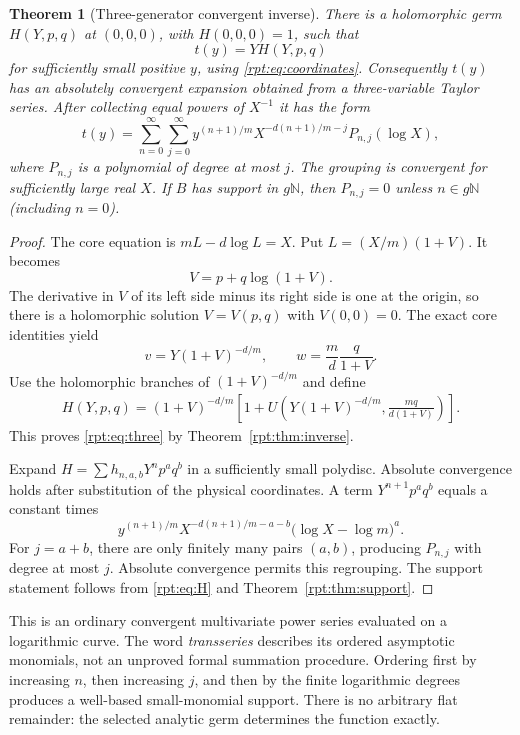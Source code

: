 \documentclass[11pt,a4paper]{article}
\numberwithin{equation}{section}
\newtheorem{theorem}{Theorem}[section]
\theoremstyle{definition}\newtheorem{definition}[theorem]{Definition}
\theoremstyle{remark}\newtheorem{remark}[theorem]{Remark}
\newcommand{\N}{\mathbb N}
\begin{document}
\begin{theorem}[Three-generator convergent inverse]
\label{rpt:thm:three}
There is a holomorphic germ $H(Y,p,q)$ at $(0,0,0)$, with $H(0,0,0)=1$, such that
\begin{equation}
t(y)=YH(Y,p,q)
\label{rpt:eq:three}
\end{equation}
for sufficiently small positive $y$, using \eqref{rpt:eq:coordinates}. Consequently $t(y)$ has an absolutely convergent expansion obtained from a three-variable Taylor series. After collecting equal powers of $X^{-1}$ it has the form
\begin{equation}
t(y)=\sum_{n=0}^{\infty}\sum_{j=0}^{\infty}
y^{(n+1)/m}X^{-d(n+1)/m-j}P_{n,j}(\log X),
\label{rpt:eq:transseries}
\end{equation}
where $P_{n,j}$ is a polynomial of degree at most $j$. The grouping is convergent for sufficiently large real $X$. If $B$ has support in $g\N$, then $P_{n,j}=0$ unless $n\in g\N$ (including $n=0$).
\end{theorem}
\begin{proof}
The core equation is $mL-d\log L=X$. Put $L=(X/m)(1+V)$. It becomes
\begin{equation}
V=p+q\log(1+V).
\label{rpt:eq:V}
\end{equation}
The derivative in $V$ of its left side minus its right side is one at the origin, so there is a holomorphic solution $V=V(p,q)$ with $V(0,0)=0$. The exact core identities yield
\[
v=Y(1+V)^{-d/m},\qquad
w=\frac{m}{d}\frac{q}{1+V}.
\]
Use the holomorphic branches of $(1+V)^{-d/m}$ and define
\begin{align}
H(Y,p,q)=(1+V)^{-d/m}
\left[1+U\left(Y(1+V)^{-d/m},\frac{m q}{d(1+V)}\right)\right].
\label{rpt:eq:H}
\end{align}
This proves \eqref{rpt:eq:three} by Theorem~\ref{rpt:thm:inverse}.

Expand $H=\sum h_{n,a,b}Y^np^aq^b$ in a sufficiently small polydisc. Absolute convergence holds after substitution of the physical coordinates. A term $Y^{n+1}p^aq^b$ equals a constant times
\[
y^{(n+1)/m}X^{-d(n+1)/m-a-b}\bigl(\log X-\log m\bigr)^a.
\]
For $j=a+b$, there are only finitely many pairs $(a,b)$, producing $P_{n,j}$ with degree at most $j$. Absolute convergence permits this regrouping. The support statement follows from \eqref{rpt:eq:H} and Theorem~\ref{rpt:thm:support}.
\end{proof}

This is an ordinary convergent multivariate power series evaluated on a logarithmic curve. The word \emph{transseries} describes its ordered asymptotic monomials, not an unproved formal summation procedure. Ordering first by increasing $n$, then increasing $j$, and then by the finite logarithmic degrees produces a well-based small-monomial support. There is no arbitrary flat remainder: the selected analytic germ determines the function exactly.
\end{document}
